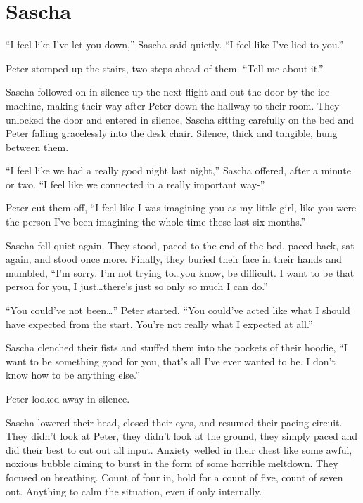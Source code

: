 \chapter{Sascha}

``I feel like I've let you down,'' Sascha said quietly. ``I feel like I've lied to you.''

Peter stomped up the stairs, two steps ahead of them. ``Tell me about it.''

Sascha followed on in silence up the next flight and out the door by the ice machine, making their way after Peter down the hallway to their room. They unlocked the door and entered in silence, Sascha sitting carefully on the bed and Peter falling gracelessly into the desk chair. Silence, thick and tangible, hung between them.

``I feel like we had a really good night last night,'' Sascha offered, after a minute or two. ``I feel like we connected in a really important way-''

Peter cut them off, ``I feel like I was imagining you as my little girl, like you were the person I've been imagining the whole time these last six months.''

Sascha fell quiet again. They stood, paced to the end of the bed, paced back, sat again, and stood once more. Finally, they buried their face in their hands and mumbled, ``I'm sorry. I'm not trying to\ldots{}you know, be difficult. I want to be that person for you, I just\ldots{}there's just so only so much I can do.''

``You could've not been\ldots{}'' Peter started. ``You could've acted like what I should have expected from the start. You're not really what I expected at all.''

Sascha clenched their fists and stuffed them into the pockets of their hoodie, ``I want to be something good for you, that's all I've ever wanted to be. I don't know how to be anything else.''

Peter looked away in silence.

Sascha lowered their head, closed their eyes, and resumed their pacing circuit. They didn't look at Peter, they didn't look at the ground, they simply paced and did their best to cut out all input. Anxiety welled in their chest like some awful, noxious bubble aiming to burst in the form of some horrible meltdown. They focused on breathing. Count of four in, hold for a count of five, count of seven out. Anything to calm the situation, even if only internally.


